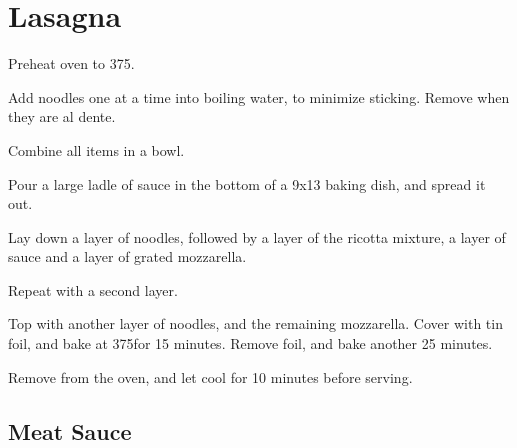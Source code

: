 
\section{Lasagna}
\begin{recipe}


Preheat oven to 375\degree.


Add noodles one at a time into boiling water, to minimize sticking. Remove when they are al dente.


Combine all items in a bowl.


Pour a large ladle of sauce in the bottom of a 9x13 baking dish, and spread it out.

Lay down a layer of noodles, followed by a layer of the ricotta mixture, a layer of sauce and a layer of grated mozzarella.

Repeat with a second layer.

Top with another layer of noodles, and the remaining mozzarella. Cover with tin foil, and bake at 375\degree for 15 minutes. Remove foil, and bake another 25 minutes.

Remove from the oven, and let cool for 10 minutes before serving.

\subsection{Meat Sauce}




\end{recipe}
